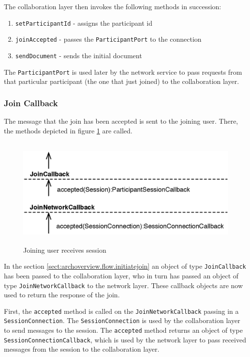 The collaboration layer then invokes the following methods in succession:
\begin{enumerate}
 \item \texttt{setParticipantId} - assigns the participant id
 \item \texttt{joinAccepted} - passes the \texttt{ParticipantPort} to the connection
 \item \texttt{sendDocument} - sends the initial document
\end{enumerate}

The \texttt{ParticipantPort} is used later by the network service to
pass requests from that particular participant (the one that just joined)
to the collaboration layer.

\subsubsection{Join Callback}
\label{sect:archoverview.flow.joinresponse}
The message that the join has been accepted is sent to the joining user. There,
the methods depicted in figure \ref{fig:archoverview.flow.joinresponse}
are called.

\begin{figure}[H]
 \centering
 \includegraphics[width=13.51cm,height=5.50cm]{../images/finalreport/architecture_flows/join_response.eps}
 \caption{Joining user receives session}
 \label{fig:archoverview.flow.joinresponse}
\end{figure}

In the section \ref{sect:archoverview.flow.initiatejoin} an object of type
\texttt{JoinCallback} has been passed to the collaboration layer, who in
turn has passed an object of type \texttt{JoinNetworkCallback} to the
network layer. These callback objects are now used to return the response
of the join.

First, the \texttt{accepted} method is called on the 
\texttt{JoinNetworkCallback} passing in a \texttt{SessionConnection}. The
\texttt{SessionConnection} is used by the collaboration layer to send messages 
to the session. The \texttt{accepted} method returns an object of type
\texttt{SessionConnectionCallback}, which is used by the network layer to
pass received messages from the session to the collaboration layer.

